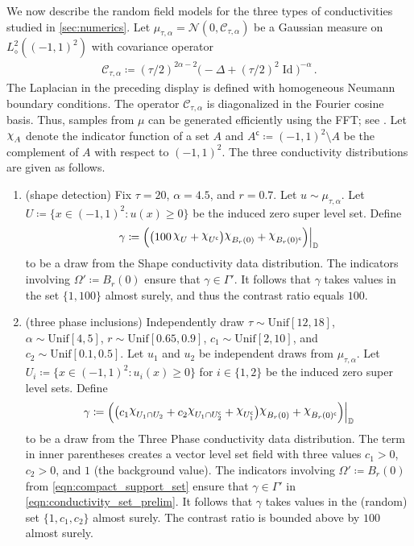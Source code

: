 \documentclass[pdflatex,sn-mathphys-num]{sn-jnl-preprint}
\newcommand{\D}{\mathbb{D}}
\newcommand{\cC}{\mathcal{C}}
\DeclareRobustCommand{\rchi}{{\mathpalette\irchi\relax}}
\newcommand{\irchi}[2]{\raisebox{\depth}{$#1\chi$}} %
\newcommand{\defeq}{\coloneqq} %
\DeclareMathOperator{\Id}{Id} %
\newcommand{\comp}{\textsf{c}} %
\newcommand{\normal}{\mathcal{N}} %
\newcommand{\Unif}{\mathrm{Unif}}
\newcommand{\al}{\alpha}
\newcommand{\sfit}[1]{\textsf{\small{#1}}} %
\theoremstyle{thmstyleone}%
\theoremstyle{thmstyletwo}%
\theoremstyle{thmstylethree}%
\numberwithin{equation}{section}
\numberwithin{theorem}{section}
\begin{document}
\begin{appendices}
We now describe the random field models for the three types of conductivities studied in \cref{sec:numerics}.
Let $\mu_{\tau,\al}=\normal(0,\cC_{\tau,\al})$ be a Gaussian measure on $L^2_\diamond((-1,1)^2)$ with covariance operator
\begin{align}\label{eqn:app_covariance_matern}
    \cC_{\tau,\al}\defeq (\tau/2)^{2\al-2}\bigl(-\Delta + (\tau/2)^2\Id\bigr)^{-\al}\,.
\end{align}
The Laplacian in the preceding display is defined with homogeneous Neumann boundary conditions.
The operator $\cC_{\tau,\al}$ is diagonalized in the Fourier cosine basis. Thus, samples from $\mu$ can be generated efficiently using the FFT; see \cite[Sec.~4]{nelsen2024operator}. Let $\rchi_A$ denote the indicator function of a set $A$ and $A^\comp\defeq (-1,1)^2\setminus A$ be the complement of $A$ with respect to $(-1,1)^2$. The three conductivity distributions are given as follows.

\begin{enumerate}[label=(\roman*),leftmargin=1.75\parindent,topsep=1.67ex,itemsep=0.5ex,partopsep=1ex,parsep=1ex]
    \item \sfit{(shape detection)} Fix $\tau=20$, $\al=4.5$, and $r=0.7$.
    Let $u\sim\mu_{\tau,\al}$. Let $U\defeq {\{x\in(-1,1)^2\colon u(x)\geq 0\}}$ be the induced zero super level set. Define
    \begin{align}\label{eqn:app_gamma_shape}
        \gamma\defeq \Bigl(\bigl(100\,\rchi_{U} + \rchi_{U^\comp}\bigr)\rchi_{B_r(0)} + \rchi_{B_r(0)^\comp}\Bigr)\Big|_{\D}
    \end{align}
    to be a draw from the Shape conductivity data distribution. The indicators involving $\Omega'\defeq B_r(0)$ ensure that $\gamma\in\Gamma'$. It follows that $\gamma$ takes values in the set $\{1, 100\}$ almost surely, and thus the contrast ratio equals $100$.

    \item \sfit{(three phase inclusions)} Independently draw $\tau\sim\Unif[12,18]$, $\al\sim\Unif[4,5]$, $r\sim\Unif[0.65,0.9]$, $c_1\sim\Unif[2,10]$, and $c_2\sim\Unif[0.1,0.5]$. Let $u_1$ and $u_2$ be independent draws from $\mu_{\tau,\al}$. Let $U_i\defeq \{x\in(-1,1)^2\colon u_i(x)\geq 0\}$ for $i\in\{1,2\}$ be the induced zero super level sets. Define
    \begin{align}\label{eqn:app_gamma_three_phase}
        \gamma\defeq \Bigl(\bigl(c_1\rchi_{U_1\cap U_2} + c_2\rchi_{U_1\cap U_2^\comp} + \rchi_{U_1^\comp}\bigr)\rchi_{B_r(0)} + \rchi_{B_r(0)^\comp}\Bigr)\Big|_{\D}
    \end{align}
    to be a draw from the Three Phase conductivity data distribution. The term in inner parentheses creates a vector level set field with three values $c_1>0$, $c_2>0$, and $1$ (the background value). The indicators involving $\Omega'\defeq B_r(0)$ from \eqref{eqn:compact_support_set} ensure that $\gamma\in\Gamma'$ in \eqref{eqn:conductivity_set_prelim}. It follows that $\gamma$ takes values in the (random) set $\{1, c_1, c_2\}$ almost surely. The contrast ratio is bounded above by $100$ almost surely.


\end{enumerate}
\end{appendices}
\end{document}

